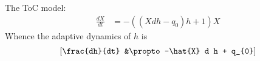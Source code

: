 \documentclass{article}
\begin{document}
The ToC model:
\[\begin{align*}
\frac{dX}{dt} &= -{\left({\left(X d h - q_{0}\right)} h + 1\right)} X
\end{align*}\]
Whence the adaptive dynamics of $h$ is
\begin{align*}
  \left[\text{\texttt{{\char`\\}frac{\char`\{}dh{\char`\}}{\char`\{}dt{\char`\}}{ }{\char`\&}{\char`\\}propto{ }{-}{\char`\\}hat{\char`\{}X{\char`\}}{ }d{ }h{ }+{ }q{\char`\_}{\char`\{}0{\char`\}}}}\right]
\end{align*}
\end{document}
